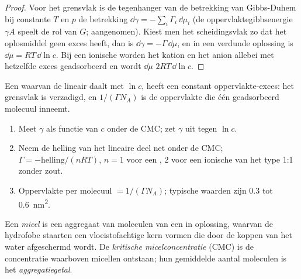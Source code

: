 \begin{proof}
Voor het grensvlak is de tegenhanger van de betrekking van Gibbs-Duhem bij constante $T$ en
$p$ de betrekking $\dd\gamma = -\sum_i\Gamma_i\,\dd\mu_i$ (de oppervlaktegibbsenergie $\gamma A$ speelt de rol van $G$;
aangenomen). Kiest men het scheidingsvlak zo dat het oplosmiddel geen
exces heeft, dan is
$\dd\gamma = -\Gamma\,\dd\mu$, en in een verdunde oplossing is $\dd\mu = RT\,\dd\ln c$. Bij een ionische 
worden het kation en het anion allebei met hetzelfde exces geadsorbeerd en
wordt $\dd\mu$
$2RT\,\dd\ln c$.
\end{proof}

Een  waarvan de  lineair daalt
met $\ln c$, heeft een constant
oppervlakte-exces: het grensvlak is verzadigd, en $1/(\Gamma N_A)$ is de oppervlakte die
één geadsorbeerd molecuul inneemt.

\begin{method}\label{met:b3:colloids:surface-excess}
\begin{enumerate}
  \item Meet $\gamma$ als functie van $c$ onder de CMC; zet $\gamma$ uit tegen $\ln c$.
  \item Neem de helling van het lineaire deel net onder de CMC; $\Gamma = -\text{helling}/(nRT)$, $n
        = 1$ voor een , 2 voor een
        ionische van het type 1:1 zonder zout.
  \item Oppervlakte per molecuul $= 1/(\Gamma N_A)$; typische waarden zijn 0.3 tot \qty{0.6}{nm^2}.
\end{enumerate}
\end{method}

\begin{definition}\label{def:b3:colloids:micelle}
Een \emph{micel} is een aggregaat van moleculen van een
 in oplossing, waarvan de hydrofobe staarten een
vloeistofachtige kern vormen die door de koppen van het water
afgeschermd wordt. De \emph{kritische micelconcentratie}
(CMC) is de concentratie waarboven micellen ontstaan; hun gemiddelde
aantal moleculen is het \emph{aggregatiegetal}.
\end{definition}


